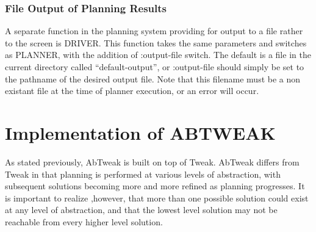 \subsubsection{File Output of Planning Results}

A separate function in the planning system providing for output to a file
rather to the screen is DRIVER.  This function takes the same parameters and
switches as PLANNER, with the addition of :output-file switch.
The default is a file in the current directory called ``default-output'', or
:output-file should simply be set to the pathname of the desired
output file.  Note that this filename must be a non existant file at the
time of planner execution, or an error will occur.

\section{Implementation of ABTWEAK}

As stated previously, AbTweak is built on top of Tweak.  AbTweak differs from  Tweak in that planning is performed at various levels of abstraction, with  subsequent solutions becoming more and more refined as planning progresses.  It is important to realize ,however, that more than one possible solution could exist
at any level of abstraction, and that the lowest level solution may not be 
reachable from every higher level solution.

